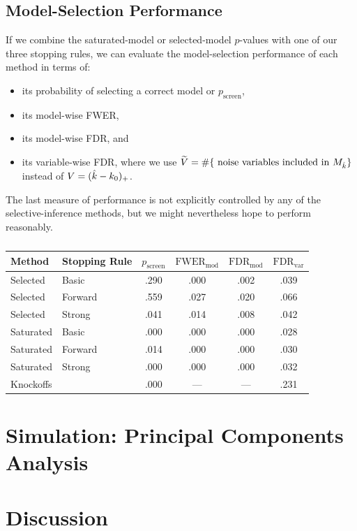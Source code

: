 \documentclass{article}
\begin{document}
\subsection{Model-Selection Performance}

If we combine the saturated-model or selected-model $p$-values with one of our three stopping rules, we can evaluate the model-selection performance of each method in terms of:
\begin{itemize}
\item its probability of selecting a correct model or $p_{\text{screen}}$,
\item its model-wise FWER,
\item its model-wise FDR, and
\item its variable-wise FDR, where we use $\widetilde{V}= \#\{\text{ noise variables included in } M_{\hat{k}}\}$ instead of $V=(\hat{k}-k_0)_+$.
\end{itemize} 
The last measure of performance is not explicitly controlled by any of the selective-inference methods, but we might nevertheless hope to perform reasonably. 


\begin{table}[ht]
  \centering
  \begin{tabular}{llcccc}
    \hline
    Method & Stopping Rule & $p_{\text{screen}}$ & $\text{FWER}_{\text{mod}}$ 
    & $\text{FDR}_{\text{mod}}$ 
    & $\text{FDR}_{\text{var}}$ \\ 
    \hline
    Selected & Basic & .290 & .000 & .002 & .039 \\ 
    Selected & Forward & .559 & .027 & .020 & .066 \\ 
    Selected & Strong & .041 & .014 & .008 & .042 \\ 
    \hline
    Saturated & Basic & .000 & .000 & .000 & .028 \\ 
    Saturated & Forward & .014 & .000 & .000 & .030 \\ 
    Saturated & Strong & .000 & .000 & .000 & .032 \\ 
    \hline
    Knockoffs & & .000 & --- & --- & .231 \\ 
    \hline
  \end{tabular}
  \caption{}
\end{table}



\section{Simulation: Principal Components Analysis}\label{sec:pca}



\section{Discussion}




\end{document}
